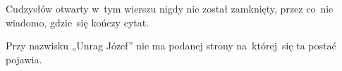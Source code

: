\documentclass[a4paper,11pt]{article}
\begin{document}
\vspace{\spaceFour}



\start {} Cudzysłów otwarty w~tym wierszu nigdy nie został
zamknięty, przez co~nie wiadomo, gdzie~się kończy cytat.

\vspace{\spaceFour}



\start {} Przy nazwisku „Unrag Józef” nie ma podanej
strony na~której~się ta postać pojawia.

\vspace{\spaceFour}





\end{document}

